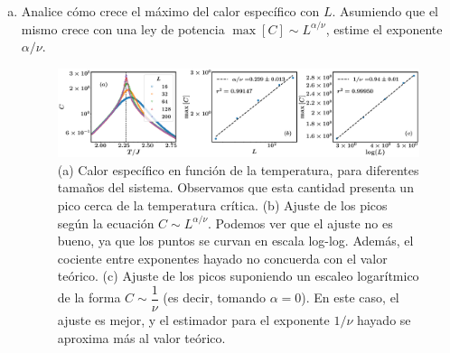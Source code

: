 \documentclass[10pt]{article}
\begin{document}
\begin{enumerate}[a)]
\pagebreak

\item Analice cómo crece el máximo del calor específico con $L$. Asumiendo que el mismo crece con una ley de potencia $\max [C] \sim L^{\alpha/\nu}$, estime el exponente $\alpha / \nu$.


\begin{figure}[ht]
\centering
\includegraphics[scale=0.27]{Fig6.pdf}
\caption{(a) Calor específico en función de la temperatura, para diferentes tamaños del sistema. Observamos que esta cantidad presenta un pico cerca de la temperatura crítica. (b) Ajuste de los picos según la ecuación $C \sim L^{\alpha / \nu}$. Podemos ver que el ajuste no es bueno, ya que los puntos se curvan en escala log-log. Además, el cociente entre exponentes hayado no concuerda con el valor teórico. (c) Ajuste de los picos suponiendo un escaleo logarítmico de la forma $C \sim \dfrac{1}{\nu}$ (es decir, tomando $\alpha = 0$). En este caso, el ajuste es mejor, y el estimador para el exponente $1/\nu$ hayado se aproxima más al valor teórico.}
\end{figure}

\end{enumerate}
\end{document}
